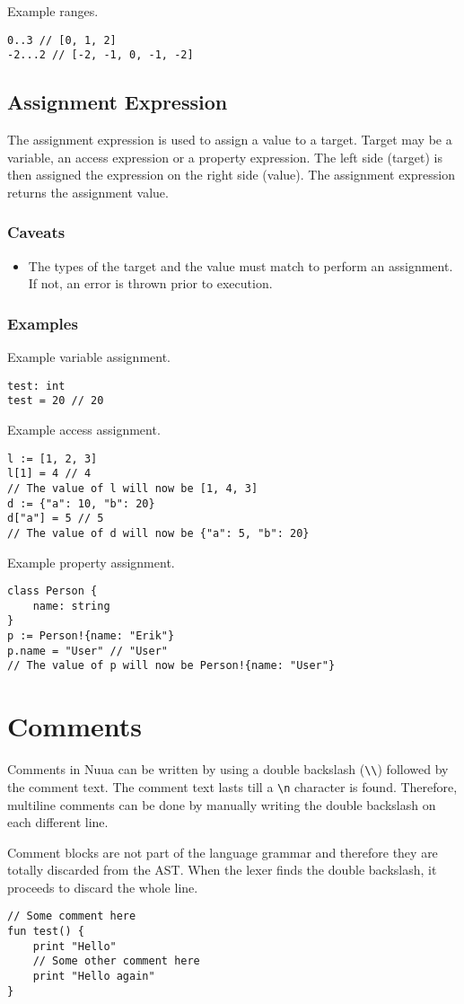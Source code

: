 Example ranges.
\begin{lstlisting}
0..3 // [0, 1, 2]
-2...2 // [-2, -1, 0, -1, -2]
\end{lstlisting}

\subsection{Assignment Expression}

The assignment expression is used to assign a value to a target. Target may be a variable, an access expression or a property expression.
The left side (target) is then assigned the expression on the right side (value). The assignment expression returns the assignment value.

\subsubsection{Caveats}

\begin{itemize}
    \item The types of the target and the value must match to perform an assignment. If not, an error is thrown prior to execution.
\end{itemize}

\subsubsection{Examples}

Example variable assignment.
\begin{lstlisting}
test: int
test = 20 // 20
\end{lstlisting}
Example access assignment.
\begin{lstlisting}
l := [1, 2, 3]
l[1] = 4 // 4
// The value of l will now be [1, 4, 3]
d := {"a": 10, "b": 20}
d["a"] = 5 // 5
// The value of d will now be {"a": 5, "b": 20}
\end{lstlisting}
Example property assignment.
\begin{lstlisting}
class Person {
    name: string
}
p := Person!{name: "Erik"}
p.name = "User" // "User"
// The value of p will now be Person!{name: "User"}
\end{lstlisting}

\section{Comments}

Comments in Nuua can be written by using a double backslash (\texttt{\textbackslash\textbackslash}) followed by the comment text.
The comment text lasts till a \texttt{\textbackslash n} character is found. Therefore, multiline comments can be done
by manually writing the double backslash on each different line.

Comment blocks are not part of the language grammar and therefore they are totally discarded from the AST. When
the lexer finds the double backslash, it proceeds to discard the whole line.

\begin{lstlisting}
// Some comment here
fun test() {
    print "Hello"
    // Some other comment here
    print "Hello again"
}
\end{lstlisting}
